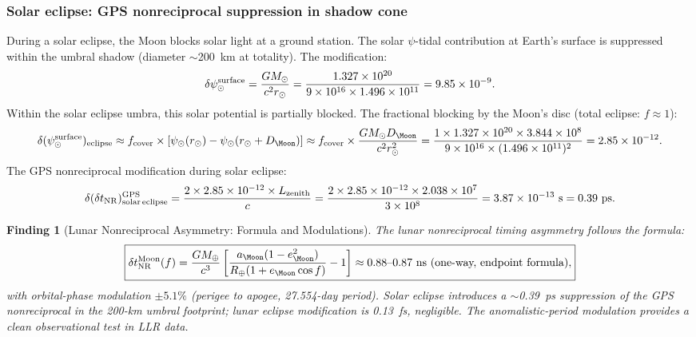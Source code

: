 \documentclass[aps,prd,twocolumn,superscriptaddress,nofootinbib,longbibliography]{revtex4-2}
\newtheorem{finding}{Finding}
\begin{document}
\subsubsection{Solar eclipse: GPS nonreciprocal suppression in shadow cone}

During a solar eclipse, the Moon blocks solar light at a ground station.
The solar $\psi$-tidal contribution at Earth's surface is suppressed within
the umbral shadow (diameter $\sim$200~km at totality).  The modification:
\begin{equation}
\delta\psi_\odot^{\rm surface} = \frac{GM_\odot}{c^2 r_\odot}
= \frac{1.327\times10^{20}}{9\times10^{16}\times1.496\times10^{11}}
= 9.85\times10^{-9}.
\end{equation}
Within the solar eclipse umbra, this solar potential is partially blocked.
The fractional blocking by the Moon's disc (total eclipse: $f \approx 1$):
\begin{equation}
\delta(\psi_\odot^{\rm surface})_{\rm eclipse}
\approx f_{\rm cover}\times\left[\psi_\odot(r_\odot) - \psi_\odot(r_\odot + D_\Moon)\right]
\approx f_{\rm cover}\times\frac{GM_\odot D_\Moon}{c^2 r_\odot^2}
= \frac{1\times1.327\times10^{20}\times3.844\times10^8}{9\times10^{16}\times(1.496\times10^{11})^2}
= 2.85\times10^{-12}.
\end{equation}
The GPS nonreciprocal modification during solar eclipse:
\begin{equation}
\delta(\delta t_{\rm NR})_{\rm solar\,eclipse}^{\rm GPS}
= \frac{2\times2.85\times10^{-12}\times L_{\rm zenith}}{c}
= \frac{2\times2.85\times10^{-12}\times2.038\times10^7}{3\times10^8}
= 3.87\times10^{-13}\ \si{s} = 0.39\ \si{ps}.
\end{equation}

\begin{finding}[Lunar Nonreciprocal Asymmetry: Formula and Modulations]
\label{finding:lunar-NR}
The lunar nonreciprocal timing asymmetry follows the formula:
\begin{equation}
\boxed{
\delta t_{\rm NR}^{\rm Moon}(f)
= \frac{GM_\oplus}{c^3}\left[\frac{a_\Moon(1-e_\Moon^2)}{R_\oplus(1+e_\Moon\cos f)} - 1\right]
\approx 0.88\text{--}0.87\ \si{ns}\ (\text{one-way, endpoint formula}),
}
\end{equation}
with orbital-phase modulation $\pm5.1\%$ (perigee to apogee, 27.554-day period).
Solar eclipse introduces a $\sim$0.39~ps suppression of the GPS nonreciprocal
in the 200-km umbral footprint; lunar eclipse modification is 0.13~fs, negligible.
The anomalistic-period modulation provides a clean observational test in LLR data.
\end{finding}
\end{document}
